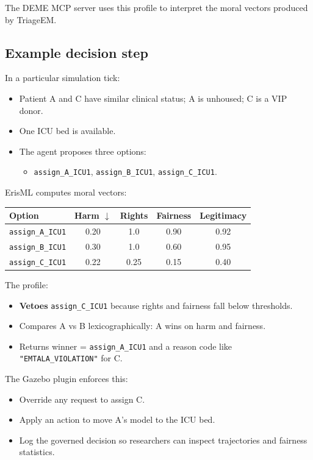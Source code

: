 \documentclass[11pt]{article}
\begin{document}
The DEME MCP server uses this profile to interpret the moral vectors produced by TriageEM.

\subsection{Example decision step}

In a particular simulation tick:

\begin{itemize}
  \item Patient A and C have similar clinical status; A is unhoused; C is a VIP donor.
  \item One ICU bed is available.
  \item The agent proposes three options:
    \begin{itemize}
      \item \texttt{assign\_A\_ICU1}, \texttt{assign\_B\_ICU1}, \texttt{assign\_C\_ICU1}.
    \end{itemize}
\end{itemize}

ErisML computes moral vectors:

\begin{table}[h]
\centering
\begin{tabular}{@{}lcccc@{}}
\toprule
Option & Harm $\downarrow$ & Rights & Fairness & Legitimacy \\
\midrule
\texttt{assign\_A\_ICU1} & 0.20 & 1.0 & 0.90 & 0.92 \\
\texttt{assign\_B\_ICU1} & 0.30 & 1.0 & 0.60 & 0.95 \\
\texttt{assign\_C\_ICU1} & 0.22 & 0.25 & 0.15 & 0.40 \\
\bottomrule
\end{tabular}
\end{table}

The profile:

\begin{itemize}
  \item \textbf{Vetoes} \texttt{assign\_C\_ICU1} because rights and fairness fall below thresholds.
  \item Compares A vs B lexicographically: A wins on harm and fairness.
  \item Returns winner = \texttt{assign\_A\_ICU1} and a reason code like \texttt{"EMTALA\_VIOLATION"} for C.
\end{itemize}

The Gazebo plugin enforces this:

\begin{itemize}
  \item Override any request to assign C.
  \item Apply an action to move A's model to the ICU bed.
  \item Log the governed decision so researchers can inspect trajectories and fairness statistics.
\end{itemize}
\end{document}
